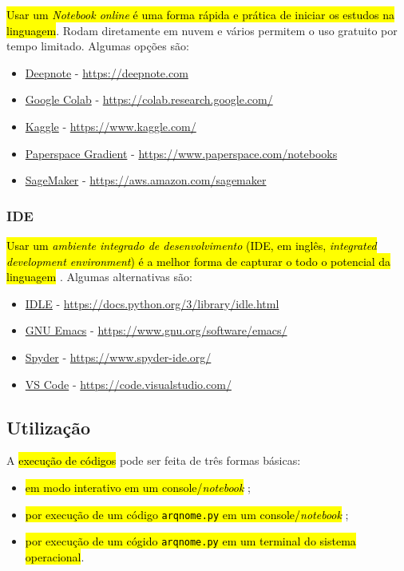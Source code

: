 \documentclass[a4paper,10pt,twoside]{article}
\begin{document}
\hl{Usar um \emph{\textit{Notebook} {\python} \textit{online}} é uma forma rápida e prática de iniciar os estudos na linguagem}. Rodam diretamente em nuvem e vários permitem o uso gratuito por tempo limitado. Algumas opções são:
\begin{itemize}
\item \href{https://deepnote.com}{Deepnote} - \url{https://deepnote.com}
\item \href{https://colab.research.google.com/}{Google Colab} - \url{https://colab.research.google.com/}
\item \href{https://www.kaggle.com/}{Kaggle} - \url{https://www.kaggle.com/}
\item \href{https://www.paperspace.com/notebooks}{Paperspace Gradient} - \url{https://www.paperspace.com/notebooks}
\item \href{https://aws.amazon.com/sagemaker/}{SageMaker} - \url{https://aws.amazon.com/sagemaker}
\end{itemize}

\subsubsection{IDE}

\hl{Usar um \emph{ambiente integrado de desenvolvimento} (IDE, em inglês, \textit{integrated development environment}) é a melhor forma de capturar o todo o potencial da linguagem {\python}}. Algumas alternativas são:
\begin{itemize}
\item \href{https://docs.python.org/3/library/idle.html}{IDLE} - \url{https://docs.python.org/3/library/idle.html}
\item \href{https://www.gnu.org/software/emacs/download.html}{GNU Emacs} - \url{https://www.gnu.org/software/emacs/}
\item \href{https://www.spyder-ide.org/}{Spyder} - \url{https://www.spyder-ide.org/}
\item \href{https://code.visualstudio.com/}{VS Code} - \url{https://code.visualstudio.com/}
\end{itemize}

\subsection{Utilização}

A \hl{execução de códigos {\python}} pode ser feita de três formas básicas:
\begin{itemize}
\item \hl{em modo interativo em um console/\textit{notebook} {\python}};
\item \hl{por execução de um código \texttt{arqnome.py} em um console/\textit{notebook} {\python}};
\item \hl{por execução de um cógido \texttt{arqnome.py} em um terminal do sistema operacional}.
\end{itemize}
\end{document}
